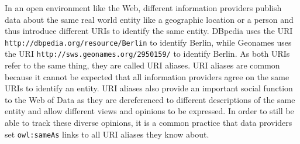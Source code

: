In an open environment like the Web, different information providers publish data about the same real world entity like a geographic location or a person and thus introduce different URIs to identify the same entity. DBpedia uses the URI \verb|http://dbpedia.org/resource/Berlin| to identify Berlin, while Geonames uses the URI
\verb|http://sws.geonames.org/2950159/| to identify Berlin. As both URIs refer to the same thing, they are called URI aliases. URI aliases are common because it cannot be expected that all information providers agree on the same URIs to
identify an entity. URI aliases also provide an important social function to the Web of Data
as they are dereferenced to different descriptions of the same entity and allow different views and opinions to be expressed. In order to still be able to track these diverse opinions, it is a common
practice that data providers set \verb|owl:sameAs| links to all URI aliases they know about.